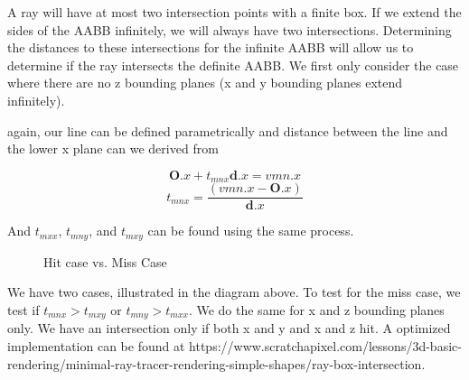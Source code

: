 \documentclass{article}
\let\vec\mathbf
\begin{document}
A ray will have at most two intersection points with a finite box. If we extend the sides of the AABB infinitely, we will always have two intersections. Determining the distances to these intersections for the infinite AABB will allow us to determine if the ray intersects the definite AABB. We first only consider the case where there are no z bounding planes (x and y bounding planes extend infinitely).

again, our line can be defined parametrically and distance between the line and the lower x plane can we derived from

$$ \vec{O}.x+t_{mnx}\vec{d}.x = vmn.x $$
$$ t_{mnx} = \frac{(vmn.x-\vec{O}.x)}{\vec{d}.x}$$

And $t_{mxx}$, $t_{mny}$, and $t_{mxy}$ can be found using the same process.

\begin{figure}[!htbp]
 \centering
    \qquad
    \caption{Hit case vs. Miss Case}%
    \label{fig:example}%
\end{figure}

We have two cases, illustrated in the diagram above. To test for the miss case, we test if $t_{mnx} > t_{mxy}$ or $t_{mny} > t_{mxx}$. We do the same for x and z bounding planes only. We have an intersection only if both x and y and x and z hit. A optimized implementation can be found at https://www.scratchapixel.com/lessons/3d-basic-rendering/minimal-ray-tracer-rendering-simple-shapes/ray-box-intersection.
\end{document}
